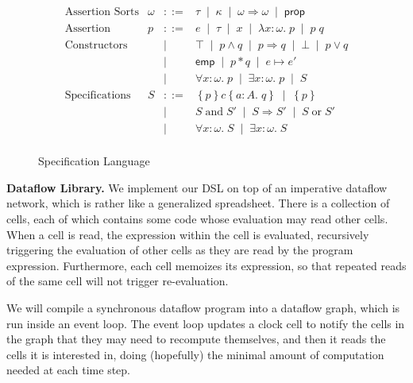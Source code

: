 \documentclass[nocopyrightspace,preprint]{sigplanconf}
\newcommand{\setof}[1]{\left\{{#1}\right\}}
\renewcommand{\implies}{\Rightarrow}
\newcommand{\spec}[4]{\setof{{#1}}{#2}\setof{{#3}.\;{#4}}}
\newcommand{\To}{\Rightarrow}
\newcommand{\fun}[2]{\lambda {#1}.\;{#2}}
\newcommand{\bnfalt}{\;\;|\;\;}
\newcommand{\pointsto}{\mapsto}
\newcommand{\emp}{\mathsf{emp}}
\newcommand{\specimp}{\Longrightarrow}
\newcommand{\specand}{\;\mathrm{and}\;}
\newcommand{\specor}{\;\mathrm{or}\;}
\newcommand{\assert}{\mathsf{prop}}
\begin{document}
\begin{figure}
{\small
\begin{displaymath}
\begin{array}{llcl}
\mbox{Assertion Sorts} & 
\omega & ::= & \tau \bnfalt \kappa \bnfalt \omega \To \omega \bnfalt \assert 
\\[0.5em]
\mbox{Assertion} & 
p & ::= & e \bnfalt \tau \bnfalt x \bnfalt \fun{x:\omega}{p} \bnfalt p\;q \\
\mbox{Constructors}
& &  |  & \top \bnfalt p \land q \bnfalt p \implies q 
          \bnfalt \bot \bnfalt p \vee q \\
& &  |  &  \emp \bnfalt p * q  \bnfalt e \pointsto e' \\
& &  |  & \forall x:\omega.\; p \bnfalt \exists x:\omega.\; p \bnfalt S
          
\\[0.5em]
\mbox{Specifications} &
S & ::= & \spec{p}{c}{a:A}{q}  \bnfalt \setof{p} \\
& &  |  & S \specand S' \bnfalt S \specimp S' \bnfalt S \specor S' \\
& &  |  & \forall x:\omega.\; S \bnfalt \exists x:\omega.\;S 
\\
\end{array}
\end{displaymath}
}
\caption{Specification Language}
\label{assert-syntax}
\end{figure}

\textbf{Dataflow Library.} We implement our DSL on top of an
imperative dataflow network, which is rather like
a generalized spreadsheet. There is a collection
of cells, each of which contains some code whose evaluation may read
other cells. When a cell is read, the expression within the cell is
evaluated, recursively triggering the evaluation of other cells as
they are read by the program expression. Furthermore, each cell
memoizes its expression, so that repeated reads of the same cell will
not trigger re-evaluation.  

We will compile a synchronous dataflow program into a dataflow graph,
which is run inside an event loop. The event loop updates a clock cell
to notify the cells in the graph that they may need to recompute
themselves, and then it reads the cells it is interested in, doing
(hopefully) the minimal amount of computation needed at each time
step.
\end{document}
